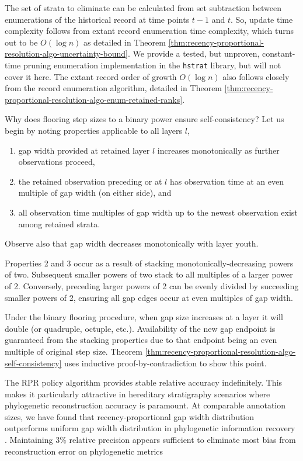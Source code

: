 The set of strata to eliminate can be calculated from set subtraction between enumerations of the historical record at time points $t-1$ and $t$.
So, update time complexity follows from extant record enumeration time complexity, which turns out to be $O(\log n)$ as detailed in Theorem \ref{thm:recency-proportional-resolution-algo-uncertainty-bound}.
We provide a tested, but unproven, constant-time pruning enumeration implementation in the \texttt{hstrat} library, but will not cover it here.
The extant record order of growth $O(\log n)$ also follows closely from the record enumeration algorithm, detailed in Theorem \ref{thm:recency-proportional-resolution-algo-enum-retained-ranks}.

Why does flooring step sizes to a binary power ensure self-consistency?
Let us begin by noting properties applicable to all layers $l$,
\begin{enumerate}
\item gap width provided at retained layer $l$ increases monotonically as further observations proceed,
\item the retained observation preceding or at $l$ has observation time at an even multiple of gap width (on either side), and
\item all observation time multiples of gap width up to the newest observation exist among retained strata.
\end{enumerate}
Observe also that gap width decreases monotonically with layer youth.

Properties 2 and 3 occur as a result of stacking monotonically-decreasing powers of two.
Subsequent smaller powers of two stack to all multiples of a larger power of 2.
Conversely, preceding larger powers of 2 can be evenly divided by succeeding smaller powers of 2, ensuring all gap edges occur at even multiples of gap width.

Under the binary flooring procedure, when gap size increases at a layer it will double (or quadruple, octuple, etc.).
Availability of the new gap endpoint is guaranteed from the stacking properties due to that endpoint being an even multiple of original step size.
Theorem \ref{thm:recency-proportional-resolution-algo-self-consistency} uses inductive proof-by-contradiction to show this point.

The RPR policy algorithm provides stable relative accuracy indefinitely.
This makes it particularly attractive in hereditary stratigraphy scenarios where phylogenetic reconstruction accuracy is paramount.
At comparable annotation sizes, we have found that recency-proportional gap width distribution outperforms uniform gap width distribution in phylogenetic information recovery \citep{moreno2022hereditary}.
Maintaining 3\% relative precision appears sufficient to eliminate most bias from reconstruction error on phylogenetic metrics \citep{moreno2023toward}

